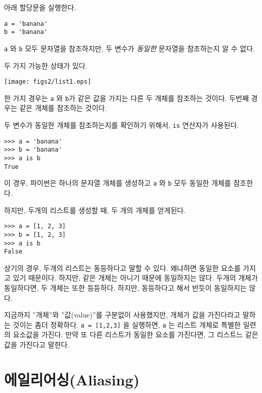 
아래 할당문을 실행한다.

\beforeverb
\begin{verbatim}
a = 'banana'
b = 'banana'
\end{verbatim}
\afterverb
%

{\tt a} 와 {\tt b} 모두 문자열을 참조하지만, 두 변수가 \emph{동일한} 문자열을 참조하는지 알 수 없다.

두 가지 가능한 상태가 있다.


\beforefig
\centerline{\texttt{[image: figs2/list1.eps]}}
\afterfig

한 가지 경우는 {\tt a} 와 {\tt b}가 같은 값을 가지는 다른 두 개체를 참조하는 것이다. 두번째 경우는 같은 개체를 참조하는 것이다.


두 변수가 동일한 개체를 참조하는지를 확인하기 위해서, {\tt is} 연산자가 사용된다.

\beforeverb
\begin{verbatim}
>>> a = 'banana'
>>> b = 'banana'
>>> a is b
True
\end{verbatim}
\afterverb
%

이 경우, 파이썬은 하나의 문자열 개체를 생성하고 {\tt a} 와 {\tt b} 모두 동일한 개체를 참조한다.

하지만, 두개의 리스트를 생성할 때, 두 개의 개체를 얻게된다.

\beforeverb
\begin{verbatim}
>>> a = [1, 2, 3]
>>> b = [1, 2, 3]
>>> a is b
False
\end{verbatim}
\afterverb
%

상기의 경우, 두개의 리스트는 동등하다고 말할 수 있다. 왜냐하면 동일한 요소를 가지고 있기 때문이다.
하지만, 같은 개체는 아니기 때문에 동일하지는 않다. 두개의 개체가 동일하다면, 두 개체는 또한 등등하다.
하지만, 동등하다고 해서 반듯이 동일하지는 않다.


지금까지 ''개체''와 ''값(value)''를 구분없이 사용했지만, 개체가 값을 가진다라고 말하는 것이는 좀더 정확하다.
{\tt a = [1,2,3]} 을 실행하면, {\tt a} 는 리스트 개체로 특별한 일련의 요소값을 가진다. 만약 또 다른 리스트가 동일한 요소를 가진다면,
그 리스트느 같은 값을 가진다고 말한다.



\section{에일리어싱(Aliasing)}

